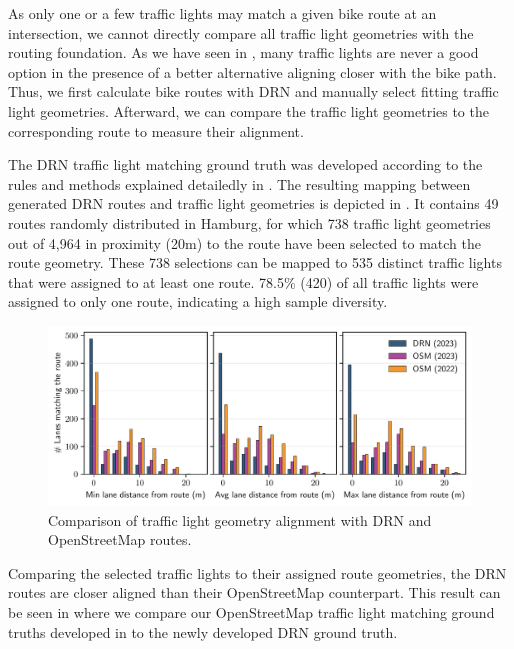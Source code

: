 As only one or a few traffic lights may match a given bike route at an intersection, we cannot directly compare all traffic light geometries with the routing foundation. As we have seen in , many traffic lights are never a good option in the presence of a better alternative aligning closer with the bike path. Thus, we first calculate bike routes with DRN and manually select fitting traffic light geometries. Afterward, we can compare the traffic light geometries to the corresponding route to measure their alignment. 

The DRN traffic light matching ground truth was developed according to the rules and methods explained detailedly in . The resulting mapping between generated DRN routes and traffic light geometries is depicted in . It contains 49 routes randomly distributed in Hamburg, for which 738 traffic light geometries out of 4,964 in proximity (20m) to the route have been selected to match the route geometry. These 738 selections can be mapped to 535 distinct traffic lights that were assigned to at least one route. 78.5\% (420) of all traffic lights were assigned to only one route, indicating a high sample diversity.

\begin{figure}[t]
\centering 
\includegraphics[width=\linewidth]{images/routing-lane-alignment.pdf}
\caption{Comparison of traffic light geometry alignment with DRN and OpenStreetMap routes.}
\label{fig:routing-lane-alignment}
\end{figure}

Comparing the selected traffic lights to their assigned route geometries, the DRN routes are closer aligned than their OpenStreetMap counterpart. This result can be seen in  where we compare our OpenStreetMap traffic light matching ground truths developed in  to the newly developed DRN ground truth. 

